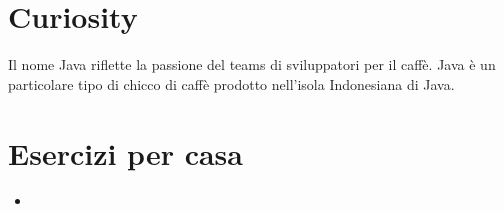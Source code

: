 \documentclass{article}
\theoremstyle{definition}
\begin{document}


\section{Curiosity}
\begin{framed}
Il nome  Java riflette la passione del teams di sviluppatori per il caff\`e. Java \`e un particolare tipo di chicco di caff\`e prodotto nell'isola  Indonesiana  di Java.
\end{framed}

\section{Esercizi per casa}
\begin{itemize}
\item 
\end{itemize}

\clearpage







\nocite{*}
\end{document}
